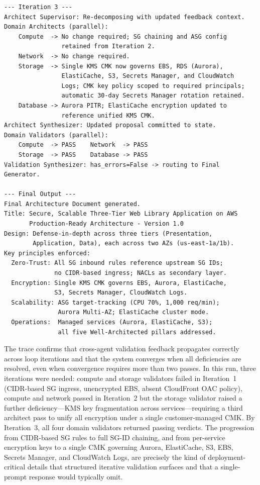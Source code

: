 \begin{verbatim}
--- Iteration 3 ---
Architect Supervisor: Re-decomposing with updated feedback context.
Domain Architects (parallel):
    Compute  -> No change required; SG chaining and ASG config
                retained from Iteration 2.
    Network  -> No change required.
    Storage  -> Single KMS CMK now governs EBS, RDS (Aurora),
                ElastiCache, S3, Secrets Manager, and CloudWatch
                Logs; CMK key policy scoped to required principals;
                automatic 30-day Secrets Manager rotation retained.
    Database -> Aurora PITR; ElastiCache encryption updated to
                reference unified KMS CMK.
Architect Synthesizer: Updated proposal committed to state.
Domain Validators (parallel):
    Compute  -> PASS    Network  -> PASS
    Storage  -> PASS    Database -> PASS
Validation Synthesizer: has_errors=False -> routing to Final Generator.

--- Final Output ---
Final Architecture Document generated.
Title: Secure, Scalable Three-Tier Web Library Application on AWS
       Production-Ready Architecture - Version 1.0
Design: Defense-in-depth across three tiers (Presentation,
        Application, Data), each across two AZs (us-east-1a/1b).
Key principles enforced:
  Zero-Trust: All SG inbound rules reference upstream SG IDs;
              no CIDR-based ingress; NACLs as secondary layer.
  Encryption: Single KMS CMK governs EBS, Aurora, ElastiCache,
              S3, Secrets Manager, CloudWatch Logs.
  Scalability: ASG target-tracking (CPU 70%, 1,000 req/min);
               Aurora Multi-AZ; ElastiCache cluster mode.
  Operations:  Managed services (Aurora, ElastiCache, S3);
               all five Well-Architected pillars addressed.
\end{verbatim}

The trace confirms that cross-agent validation feedback propagates correctly across loop iterations and that the system converges when all deficiencies are resolved, even when convergence requires more than two passes. In this run, three iterations were needed: compute and storage validators failed in Iteration~1 (CIDR-based SG ingress, unencrypted EBS, absent CloudFront OAC policy), compute and network passed in Iteration~2 but the storage validator raised a further deficiency---KMS key fragmentation across services---requiring a third architect pass to unify all encryption under a single customer-managed CMK. By Iteration~3, all four domain validators returned passing verdicts. The progression from CIDR-based SG rules to full SG-ID chaining, and from per-service encryption keys to a single CMK governing Aurora, ElastiCache, S3, EBS, Secrets Manager, and CloudWatch Logs, are precisely the kind of deployment-critical details that structured iterative validation surfaces and that a single-prompt response would typically omit.

